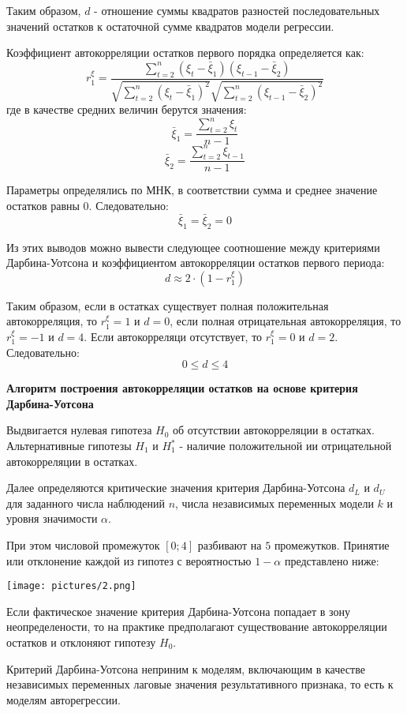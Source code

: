 \documentclass[aps,%
12pt,%
final,%
oneside,
onecolumn,%
musixtex, %
superscriptaddress,%
centertags]{article} %
\theoremstyle{plain}
\theoremstyle{definition}
\theoremstyle{remark}
\begin{document}
Таким образом, $d$ - отношение суммы квадратов разностей последовательных значений остатков к остаточной сумме квадратов модели регрессии. 

Коэффициент автокорреляции остатков первого порядка определяется как:
$$r_1^{\xi} = \frac{\sum\limits_{t=2}^n (\xi_t - \bar{\xi}_1)(\xi_{t-1}-\bar{\xi}_2)}{\sqrt{\sum\limits_{t=2}^n (\xi_t - \bar{\xi}_1)^2 }\sqrt{\sum\limits_{t=2}^n (\xi_{t-1} - \bar{\xi}_2)^2 }}$$
где в качестве средних величин берутся значения:
$$\bar{\xi}_1 = \frac{\sum\limits_{t=2}^n \xi_t}{n-1}$$
$$\bar{\xi}_2 = \frac{\sum\limits_{t=2}^n \xi_{t-1}}{n-1}$$

Параметры определялись по МНК, в соответствии сумма и среднее значение остатков равны $0$. Следовательно:
$$\bar{\xi}_1 = \bar{\xi}_2 = 0$$

Из этих выводов можно вывести следующее соотношение между критериями Дарбина-Уотсона и коэффициентом автокорреляции остатков первого периода:
$$d \approx 2 \cdot (1-r_1^{\xi})$$

Таким образом, если в остатках существует полная положительная автокорреляция, то $r_1^{\xi} = 1$ и $d=0$, если полная отрицательная автокорреляция,  то $r_1^{\xi} = -1$ и $d=4$. Если автокорреляци отсутствует,  то $r_1^{\xi} = 0$ и $d=2$. Следовательно:
$$0 \leq d \leq 4$$ 

\textbf{Алгоритм построения автокорреляции остатков на основе критерия Дарбина-Уотсона}

Выдвигается нулевая гипотеза $H_0$ об отсутствии автокорреляции в остатках. Альтернативные гипотезы $H_1$ и $H_1^*$ - наличие положительной ии отрицательной автокорреляции в остатках.

Далее определяются критические значения критерия Дарбина-Уотсона $d_L$ и $d_U$ для заданного числа наблюдений $n$, числа независимых переменных модели $k$ и уровня значимости $\alpha$.

При этом числовой промежуток $[0;4]$ разбивают на $5$ промежутков. Принятие или отклонение каждой из гипотез с вероятностью $1-\alpha$ представлено ниже:

\begin{center}
	\texttt{[image: pictures/2.png]}
\end{center}

Если фактическое значение критерия Дарбина-Уотсона попадает в зону неопределености, то на практике предполагают существование автокорреляции остатков и отклоняют гипотезу $H_0$.

Критерий Дарбина-Уотсона неприним к моделям, включающим в качестве независимых переменных лаговые значения результативного признака, то есть к моделям авторегрессии.
\end{document}
